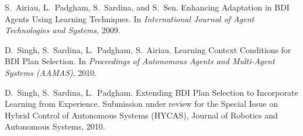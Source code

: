 \documentclass[a4paper]{article}
\begin{document}
\begin{thebibliography}{10}

S.~Airiau, L.~Padgham, S.~Sardina, and S.~Sen.
\newblock Enhancing Adaptation in {BDI} Agents Using Learning Techniques.
\newblock In {\em International Journal of Agent Technologies and Systems},
2009.

D.~Singh, S.~Sardina, L.~Padgham, S.~Airiau.
\newblock Learning Context Conditions for {BDI} Plan Selection.
\newblock In {\em Proceedings of Autonomous Agents and Multi-Agent Systems (AAMAS)}, 2010.

D.~Singh, S.~Sardina, L.~Padgham.
\newblock Extending BDI Plan Selection to Incorporate Learning from Experience.
\newblock Submission under review for the Special Issue on Hybrid Control of Autonomous Systems (HYCAS), Journal of Robotics and Autonomous Systems, 2010.


\end{thebibliography}
\end{document}
